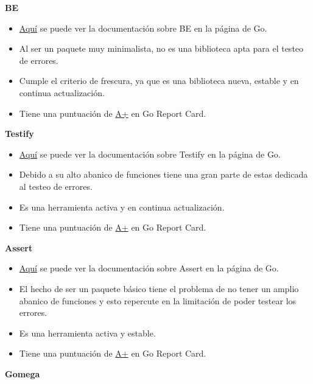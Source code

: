 \textbf{BE}

\begin{itemize}
\item
  \href{https://pkg.go.dev/github.com/carlmjohnson/be}{Aquí} se puede
  ver la documentación sobre BE en la página de Go.
\item
  Al ser un paquete muy minimalista, no es una biblioteca apta para el
  testeo de errores.
\item
  Cumple el criterio de frescura, ya que es una biblioteca nueva, estable
  y en continua actualización.
\item
  Tiene una puntuación de
  \href{https://goreportcard.com/report/github.com/carlmjohnson/be}{A+}
  en Go Report Card.
\end{itemize}

\textbf{Testify}

\begin{itemize}
\item
  \href{https://pkg.go.dev/github.com/stretchr/testify}{Aquí} \cite{go-dev} se puede
  ver la documentación sobre Testify en la página de Go.
\item
  Debido a su alto abanico de funciones tiene una gran parte de estas
  dedicada al testeo de errores.
\item
  Es una herramienta activa y en continua actualización.
\item
  Tiene una puntuación de
  \href{https://goreportcard.com/report/github.com/stretchr/testify}{A+}
  en Go Report Card.
\end{itemize}

\textbf{Assert}

\begin{itemize}
\item
  \href{https://pkg.go.dev/gopkg.in/go-playground/assert.v1}{Aquí} se
  puede ver la documentación sobre Assert en la página de Go.
\item
  El hecho de ser un paquete básico tiene el problema de no tener un
  amplio abanico de funciones y esto repercute en la limitación de poder
  testear los errores.
\item
  Es una herramienta activa y estable.
\item
  Tiene una puntuación de
  \href{https://goreportcard.com/report/github.com/go-playground/assert}{A+}
  en Go Report Card.
\end{itemize}

\textbf{Gomega}

